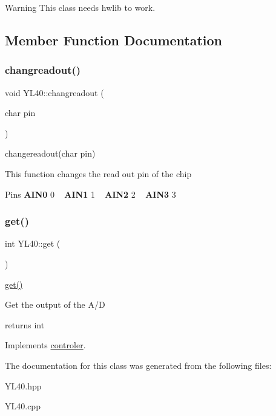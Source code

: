 \begin{DoxyWarning}{Warning}
This class needs hwlib to work. 
\end{DoxyWarning}


\subsection{Member Function Documentation}
\mbox{\label{class_y_l40_a97593c0f3ab5284c2a1258ed81f32d96}} 
\subsubsection{\texorpdfstring{changreadout()}{changreadout()}}
{\footnotesize\ttfamily void Y\+L40\+::changreadout (\begin{DoxyParamCaption}\item[{char}]{pin }\end{DoxyParamCaption})}



changereadout(char pin) 

This function changes the read out pin of the chip

\begin{DoxyParagraph}{Pins}
{\bfseries A\+I\+N0} 0 ~\newline
 {\bfseries A\+I\+N1} 1 ~\newline
 {\bfseries A\+I\+N2} 2 ~\newline
 {\bfseries A\+I\+N3} 3 ~\newline

\end{DoxyParagraph}
\mbox{\label{class_y_l40_a3e0322c2c8c8dfed7466056173bc563e}} 
\subsubsection{\texorpdfstring{get()}{get()}}
{\footnotesize\ttfamily int Y\+L40\+::get (\begin{DoxyParamCaption}{ }\end{DoxyParamCaption})\hspace{0.3cm}{\ttfamily [virtual]}}



\mbox{\hyperlink{class_y_l40_a3e0322c2c8c8dfed7466056173bc563e}{get()}} 

Get the output of the A/D

returns int 

Implements \mbox{\hyperlink{classcontroler}{controler}}.



The documentation for this class was generated from the following files\+:\begin{DoxyCompactItemize}
\item 
Y\+L40.\+hpp\item 
Y\+L40.\+cpp\end{DoxyCompactItemize}

